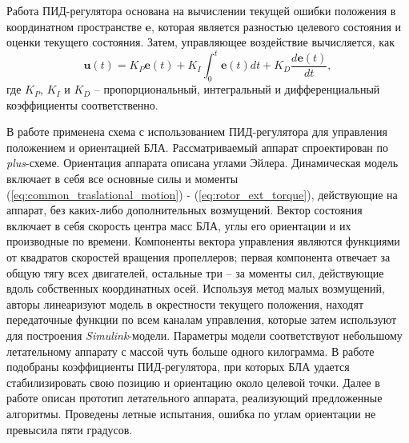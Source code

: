 Работа ПИД-регулятора основана на вычислении текущей ошибки положения в координатном пространстве $\bm{e}$, которая является разностью целевого состояния и оценки текущего состояния. Затем, управляющее воздействие вычисляется, как
\begin{equation} \label{eq:pid_common}
\bm{u}(t) = K_P \bm{e}(t) + K_I\int_0^t \bm{e}(t) dt + K_D \frac{d\bm{e}(t)}{dt},
\end{equation}
где $K_P$, $K_I$ и $K_D$ -- пропорциональный, интегральный и дифференциальный коэффициенты соответственно.

В работе \cite{Li01} применена схема с использованием ПИД-регулятора для управления положением и ориентацией БЛА.
Рассматриваемый аппарат спроектирован по \textit{plus}-схеме.
Ориентация аппарата описана углами Эйлера.
Динамическая модель включает в себя все основные силы и моменты (\ref{eq:common_traslational_motion}) - (\ref{eq:rotor_ext_torque}), действующие на аппарат, без каких-либо дополнительных возмущений.
Вектор состояния включает в себя скорость центра масс БЛА, углы его ориентации и их производные по времени.
Компоненты вектора управления являются функциями от квадратов скоростей вращения пропеллеров; первая компонента отвечает за общую тягу всех двигателей, остальные три -- за моменты сил, действующие вдоль собственных координатных осей.
Используя метод малых возмущений, авторы линеаризуют модель в окрестности текущего положения, находят передаточные функции по всем каналам управления, которые затем используют для построения \textit{Simulink}-модели.
Параметры модели соответствуют небольшому летательному аппарату с массой чуть больше одного килограмма.
В работе подобраны коэффициенты ПИД-регулятора, при которых БЛА удается стабилизировать свою позицию и ориентацию около целевой точки.
Далее в работе описан прототип летательного аппарата, реализующий предложенные алгоритмы.
Проведены летные испытания, ошибка по углам ориентации не превысила пяти градусов.

